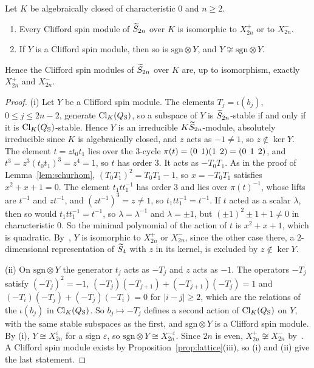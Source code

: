 \begin{proposition}\label{prop:schurspin}
Let $K$ be algebraically closed of characteristic $0$ and $n\ge2$.
\begin{enumerate}
\item Every Clifford spin module of $\widetilde{S}_{2n}$ over $K$ is isomorphic to $X_{2n}^+$ or to $X_{2n}^-$.
\item If $Y$ is a Clifford spin module, then so is $\mathrm{sgn}\otimes Y$, and $Y\not\cong\mathrm{sgn}\otimes Y$.
\end{enumerate}
Hence the Clifford spin modules of $\widetilde{S}_{2n}$ over $K$ are, up to isomorphism, exactly $X_{2n}^+$ and $X_{2n}^-$.
\end{proposition}

\begin{proof}
(i) Let $Y$ be a Clifford spin module. The elements $T_j=\iota(b_j)$, $0\le j\le2n-2$, generate $\operatorname{Cl}_K(Q_{\mathrm S})$, so a subspace of $Y$ is $\widetilde{S}_{2n}$-stable if and only if it is $\operatorname{Cl}_K(Q_{\mathrm S})$-stable. Hence $Y$ is an irreducible $K\widetilde{S}_{2n}$-module, absolutely irreducible since $K$ is algebraically closed, and $z$ acts as $-1\ne1$, so $z\notin\ker Y$. The element $t=zt_0t_1$ lies over the $3$-cycle $\pi(t)=(0\;\,1)(1\;\,2)=(0\;\,1\;\,2)$, and $t^3=z^3{(t_0t_1)}^3=z^4=1$, so $t$ has order $3$. It acts as $-T_0T_1$. As in the proof of Lemma~\ref{lem:schurhom}, ${(T_0T_1)}^2=T_0T_1-1$, so $x=-T_0T_1$ satisfies $x^2+x+1=0$. The element $t_1tt_1^{-1}$ has order $3$ and lies over ${\pi(t)}^{-1}$, whose lifts are $t^{-1}$ and $zt^{-1}$, and ${(zt^{-1})}^3=z\ne1$, so $t_1tt_1^{-1}=t^{-1}$. If $t$ acted as a scalar $\lambda$, then so would $t_1tt_1^{-1}=t^{-1}$, so $\lambda=\lambda^{-1}$ and $\lambda=\pm1$, but ${(\pm1)}^2\pm1+1\ne0$ in characteristic $0$. So the minimal polynomial of the action of $t$ is $x^2+x+1$, which is quadratic. By~\cite[Thm.~1(3)]{Maas10}, $Y$ is isomorphic to $X_{2n}^+$ or $X_{2n}^-$, since the other case there, a $2$-dimensional representation of $\widetilde{S}_4$ with $z$ in its kernel, is excluded by $z\notin\ker Y$.

(ii) On $\mathrm{sgn}\otimes Y$ the generator $t_j$ acts as $-T_j$ and $z$ acts as $-1$. The operators $-T_j$ satisfy ${(-T_j)}^2=-1$, $(-T_j)(-T_{j+1})+(-T_{j+1})(-T_j)=1$ and $(-T_i)(-T_j)+(-T_j)(-T_i)=0$ for $|i-j|\ge2$, which are the relations of the $\iota(b_j)$ in $\operatorname{Cl}_K(Q_{\mathrm S})$. So $b_j\mapsto-T_j$ defines a second action of $\operatorname{Cl}_K(Q_{\mathrm S})$ on $Y$, with the same stable subspaces as the first, and $\mathrm{sgn}\otimes Y$ is a Clifford spin module. By (i), $Y\cong X_{2n}^\varepsilon$ for a sign $\varepsilon$, so $\mathrm{sgn}\otimes Y\cong X_{2n}^{-\varepsilon}$. Since $2n$ is even, $X_{2n}^+\not\cong X_{2n}^-$ by~\cite[Thm.~1(1)]{Maas10}. A Clifford spin module exists by Proposition~\ref{prop:lattice}(iii), so (i) and (ii) give the last statement.
\end{proof}

